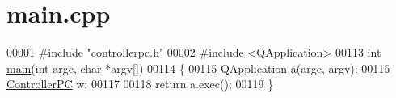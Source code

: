 \hypertarget{main_8cpp_source}{\section{main.\-cpp}
}

\begin{DoxyCode}
00001 \textcolor{preprocessor}{#include "\hyperlink{controllerpc_8h}{controllerpc.h}"}
00002 \textcolor{preprocessor}{#include <QApplication>}
\hypertarget{main_8cpp_source_l00113}{}\hyperlink{main_8cpp_a0ddf1224851353fc92bfbff6f499fa97}{00113} \textcolor{keywordtype}{int} \hyperlink{main_8cpp_a0ddf1224851353fc92bfbff6f499fa97}{main}(\textcolor{keywordtype}{int} argc, \textcolor{keywordtype}{char} *argv[])
00114 \{
00115     QApplication a(argc, argv);
00116     \hyperlink{class_controller_p_c}{ControllerPC} w;
00117 
00118     \textcolor{keywordflow}{return} a.exec();
00119 \}
\end{DoxyCode}
